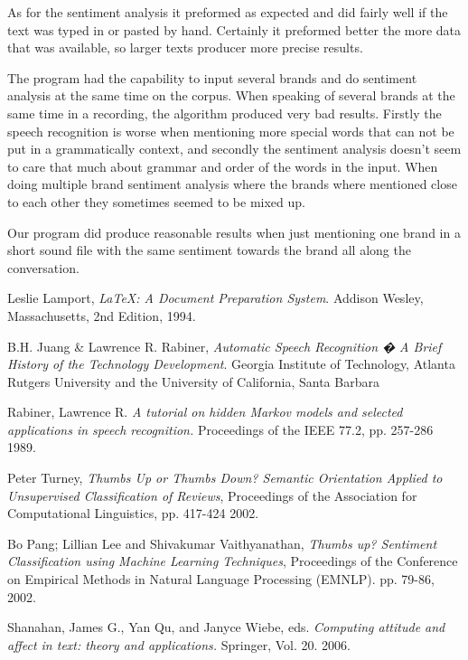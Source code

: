 \documentclass[a4paper,12pt,twoside]{ltxdoc}
\begin{document}
As for the sentiment analysis it preformed as expected and did fairly well if the text was typed in or pasted by hand. Certainly it preformed better the more data that was available, so larger texts producer more precise results. 

The program had the capability to input several brands and do sentiment analysis at the same time on the corpus. When speaking of several brands at the same time in a recording, the algorithm produced very bad results. Firstly the speech recognition is worse when mentioning more special words that can not be put in a grammatically context, and secondly the sentiment analysis doesn't seem to care that much about grammar and order of the words in the input. When doing multiple brand sentiment analysis where the brands where mentioned close to each other they sometimes seemed to be mixed up. 

Our program did produce reasonable results when just mentioning one brand in a short sound file with the same sentiment towards the brand all along the conversation. 


\newpage 

\begin{thebibliography}{9}

  Leslie Lamport,
  \emph{\LaTeX: A Document Preparation System}.
  Addison Wesley, Massachusetts,
  2nd Edition,
  1994.
  
  B.H. Juang \& Lawrence R. Rabiner,
  \emph{Automatic Speech Recognition � A Brief History of the Technology Development}.
  Georgia Institute of Technology, Atlanta
  Rutgers University and the University of California, Santa Barbara
  
Rabiner, Lawrence R.
\emph{A tutorial on hidden Markov models and selected applications in speech recognition.}
Proceedings of the IEEE 77.2,
pp. 257-286
1989.

Peter Turney, 
\emph{Thumbs Up or Thumbs Down? Semantic Orientation Applied to Unsupervised Classification of Reviews},
 Proceedings of the Association for Computational Linguistics,
 pp. 417-424
 2002.

  Bo Pang; Lillian Lee and Shivakumar Vaithyanathan,
  \emph{Thumbs up? Sentiment Classification using Machine Learning Techniques},
  Proceedings of the Conference on Empirical Methods in Natural Language Processing (EMNLP).
  pp. 79-86,
  2002.

  Shanahan, James G., Yan Qu, and Janyce Wiebe, eds.
  \emph{Computing attitude and affect in text: theory and applications.}
  Springer, 
  Vol. 20.
  2006.

\end{thebibliography}
\end{document}
